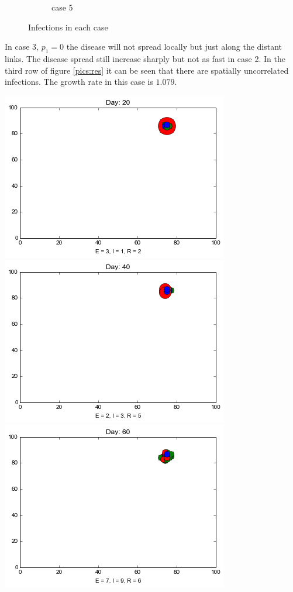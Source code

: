 \begin{figure}[!htb]
\begin{subfigure}[b]{0.3\textwidth}
        \caption{case 5}
        \label{e}
    \end{subfigure}
    \caption{Infections in each case}\label{fig5.4}
\end{figure}
\newpage

In case 3, $p_1 = 0$ the disease will not spread locally but just along the distant links. The disease spread still increase sharply but not as fast in case 2. In the third row of figure \ref{pics:res} it can be seen that there are spatially uncorrelated infections. The growth rate in this case is $1.079$. 


\begin{minipage}{\linewidth}

\centering
\includegraphics[scale=0.28]{images/1t20.png} \quad
\includegraphics[scale=0.28]{images/1t40.png} \quad
\includegraphics[scale=0.28]{images/1t60.png} \quad

\end{minipage}
